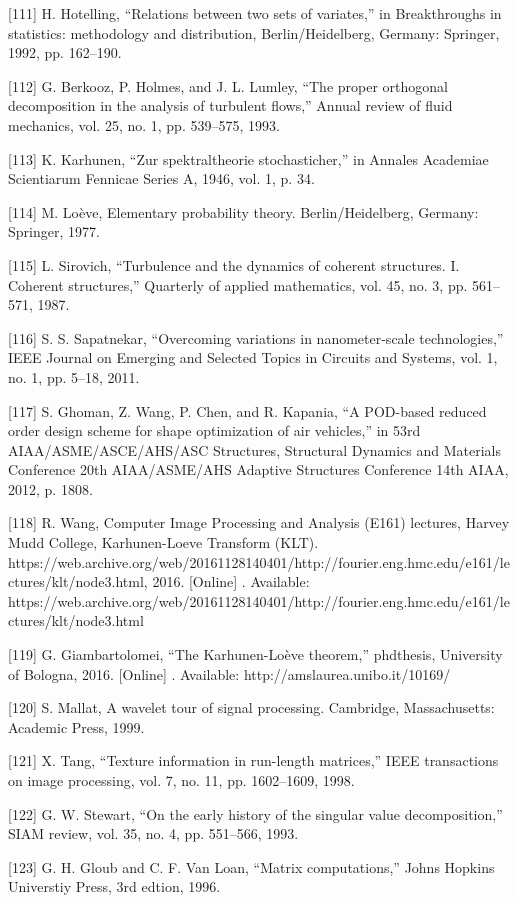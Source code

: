 \documentclass[sn-mathphys-num]{sn-jnl}%
\begin{document}
[111] H. Hotelling, “Relations between two sets of variates,” in Breakthroughs in statistics: methodology and distribution, Berlin/Heidelberg, Germany: Springer, 1992, pp. 162–190.

[112] G. Berkooz, P. Holmes, and J. L. Lumley, “The proper orthogonal decomposition in the analysis of turbulent flows,” Annual review of fluid mechanics, vol. 25, no. 1, pp. 539–575, 1993.

[113] K. Karhunen, “Zur spektraltheorie stochasticher,” in Annales Academiae Scientiarum Fennicae Series A, 1946, vol. 1, p. 34.

[114] M. Loève, Elementary probability theory. Berlin/Heidelberg, Germany: Springer, 1977.

[115] L. Sirovich, “Turbulence and the dynamics of coherent structures. I. Coherent structures,” Quarterly of applied mathematics, vol. 45, no. 3, pp. 561–571, 1987.

[116] S. S. Sapatnekar, “Overcoming variations in nanometer-scale technologies,” IEEE Journal on Emerging and Selected Topics in Circuits and Systems, vol. 1, no. 1, pp. 5–18, 2011.

[117] S. Ghoman, Z. Wang, P. Chen, and R. Kapania, “A POD-based reduced order design scheme for shape optimization of air vehicles,” in 53rd AIAA/ASME/ASCE/AHS/ASC Structures, Structural Dynamics and Materials Conference 20th AIAA/ASME/AHS Adaptive Structures Conference 14th AIAA, 2012, p. 1808.

[118] R. Wang, Computer Image Processing and Analysis (E161) lectures, Harvey Mudd College, Karhunen-Loeve Transform (KLT). https://web.archive.org/web/20161128140401/http://fourier.eng.hmc.edu/e161/lectures/klt/node3.html, 2016. [Online] . Available: https://web.archive.org/web/20161128140401/http://fourier.eng.hmc.edu/e161/lectures/klt/node3.html

[119] G. Giambartolomei, “The Karhunen-Loève theorem,” phdthesis, University of Bologna, 2016. [Online] . Available: http://amslaurea.unibo.it/10169/

[120] S. Mallat, A wavelet tour of signal processing. Cambridge, Massachusetts: Academic Press, 1999.

[121] X. Tang, “Texture information in run-length matrices,” IEEE transactions on image processing, vol. 7, no. 11, pp. 1602–1609, 1998.

[122] G. W. Stewart, “On the early history of the singular value decomposition,” SIAM review, vol. 35, no. 4, pp. 551–566, 1993.

[123] G. H. Gloub and C. F. Van Loan, “Matrix computations,” Johns Hopkins Universtiy Press, 3rd edtion, 1996.
\end{document}
